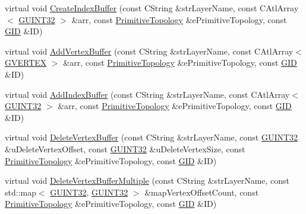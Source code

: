 \begin{DoxyCompactItemize}
\item 
virtual void \hyperlink{class_c_g_d_c_direct_x11_a91bc963cf3eb977667cf58fba58a7cc5}{Create\+Index\+Buffer} (const C\+String \&str\+Layer\+Name, const C\+Atl\+Array$<$ \hyperlink{_g_types_8h_a2e1a1c77d1349057202e2f34e071019c}{G\+U\+I\+N\+T32} $>$ \&arr, const \hyperlink{_g_types_8h_a940e3da6a9b57aae3de0b050e2a7af5e}{Primitive\+Topology} \&e\+Primitive\+Topology, const \hyperlink{_g_types_8h_a5b96ecb16d8e437977d12cd40aa6f6d8}{G\+I\+D} \&I\+D)
\item 
virtual void \hyperlink{class_c_g_d_c_direct_x11_a5a0ffb15078db39a302d871c6bbb16bc}{Add\+Vertex\+Buffer} (const C\+String \&str\+Layer\+Name, const C\+Atl\+Array$<$ \hyperlink{struct_g_v_e_r_t_e_x}{G\+V\+E\+R\+T\+E\+X} $>$ \&arr, const \hyperlink{_g_types_8h_a940e3da6a9b57aae3de0b050e2a7af5e}{Primitive\+Topology} \&e\+Primitive\+Topology, const \hyperlink{_g_types_8h_a5b96ecb16d8e437977d12cd40aa6f6d8}{G\+I\+D} \&I\+D)
\item 
virtual void \hyperlink{class_c_g_d_c_direct_x11_a41f01fa96b71933e9d232fa4dcc49c48}{Add\+Index\+Buffer} (const C\+String \&str\+Layer\+Name, const C\+Atl\+Array$<$ \hyperlink{_g_types_8h_a2e1a1c77d1349057202e2f34e071019c}{G\+U\+I\+N\+T32} $>$ \&arr, const \hyperlink{_g_types_8h_a940e3da6a9b57aae3de0b050e2a7af5e}{Primitive\+Topology} \&e\+Primitive\+Topology, const \hyperlink{_g_types_8h_a5b96ecb16d8e437977d12cd40aa6f6d8}{G\+I\+D} \&I\+D)
\item 
virtual void \hyperlink{class_c_g_d_c_direct_x11_a8091db9ef113bf132dc77a6a9cfb8589}{Delete\+Vertex\+Buffer} (const C\+String \&str\+Layer\+Name, const \hyperlink{_g_types_8h_a2e1a1c77d1349057202e2f34e071019c}{G\+U\+I\+N\+T32} \&u\+Delete\+Vertex\+Offset, const \hyperlink{_g_types_8h_a2e1a1c77d1349057202e2f34e071019c}{G\+U\+I\+N\+T32} \&u\+Delete\+Vertex\+Size, const \hyperlink{_g_types_8h_a940e3da6a9b57aae3de0b050e2a7af5e}{Primitive\+Topology} \&e\+Primitive\+Topology, const \hyperlink{_g_types_8h_a5b96ecb16d8e437977d12cd40aa6f6d8}{G\+I\+D} \&I\+D)
\item 
virtual void \hyperlink{class_c_g_d_c_direct_x11_a2cd83239d816a8c4409df1b3ac1a4f03}{Delete\+Vertex\+Buffer\+Multiple} (const C\+String \&str\+Layer\+Name, const std\+::map$<$ \hyperlink{_g_types_8h_a2e1a1c77d1349057202e2f34e071019c}{G\+U\+I\+N\+T32}, \hyperlink{_g_types_8h_a2e1a1c77d1349057202e2f34e071019c}{G\+U\+I\+N\+T32} $>$ \&map\+Vertex\+Offset\+Count, const \hyperlink{_g_types_8h_a940e3da6a9b57aae3de0b050e2a7af5e}{Primitive\+Topology} \&e\+Primitive\+Topology, const \hyperlink{_g_types_8h_a5b96ecb16d8e437977d12cd40aa6f6d8}{G\+I\+D} \&I\+D)

\end{DoxyCompactItemize}
